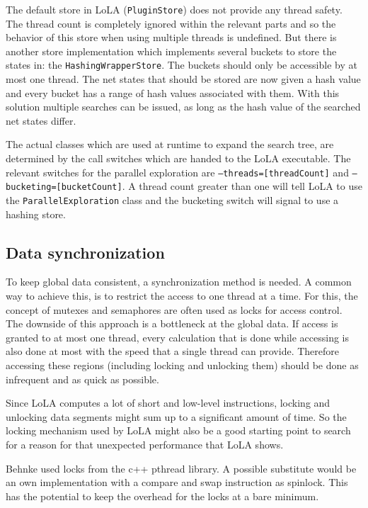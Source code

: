 The default store in LoLA (\texttt{PluginStore}) does not provide any thread safety. The thread count is completely ignored within the relevant parts and so the behavior of this store when using multiple threads is undefined. But there is another store implementation which implements several buckets to store the states in: the \texttt{HashingWrapperStore}. The buckets should only be accessible by at most one thread. The net states that should be stored are now given a hash value and every bucket has a range of hash values associated with them. With this solution multiple searches can be issued, as long as the hash value of the searched net states differ.

The actual classes which are used at runtime to expand the search tree, are determined by the call switches which are handed to the LoLA executable. The relevant switches for the parallel exploration are \texttt{--threads=[threadCount]} and \texttt{--bucketing=[bucketCount]}. A thread count greater than one will tell LoLA to use the \texttt{ParallelExploration} class and the bucketing switch will signal to use a hashing store.

\subsection{Data synchronization}
To keep global data consistent, a synchronization method is needed. A common way to achieve this, is to restrict the access to one thread at a time. For this, the concept of mutexes and semaphores are often used as locks for access control. The downside of this approach is a bottleneck at the global data. If access is granted to at most one thread, every calculation that is done while accessing is also done at most with the speed that a single thread can provide. Therefore accessing these regions (including locking and unlocking them) should be done as infrequent and as quick as possible.

Since LoLA computes a lot of short and low-level instructions, locking and unlocking data segments might sum up to a significant amount of time. So the locking mechanism used by LoLA might also be a good starting point to search for a reason for that unexpected performance that LoLA shows.

Behnke used locks from the c++ pthread library. A possible substitute would be an own implementation with a compare and swap instruction as spinlock. This has the potential to keep the overhead for the locks at a bare minimum.

